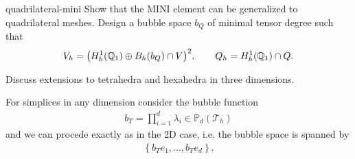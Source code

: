 \begin{Problem}{quadrilateral-mini}
  Show that the MINI element can be generalized to quadrilateral
  meshes. Design a bubble space $b_Q$ of minimal tensor degree such that
  \begin{gather*}
    V_h = \bigl(H^1_h(\mathbb Q_1) \oplus B_h(b_Q) \cap V\bigr)^2,
    \qquad
    Q_h = H^1_h(\mathbb Q_1) \cap Q.
  \end{gather*}

  Discuss extensions to tetrahedra and hexahedra in three dimensions.
\begin{solution}
  For simplices in any dimension consider the bubble function
  \begin{align*}
    b_T=\prod_{i=1}^d\lambda_i\in \mathbb{P}_d(\mathcal{T}_h)
  \end{align*}
  and we can procede exactly as in the 2D case, i.e. the bubble
  space is spanned by
  \begin{align*}
   \left\{b_T e_1,\dotsc, b_T e_d\right\}.
  \end{align*}


\end{solution}
\end{Problem}
